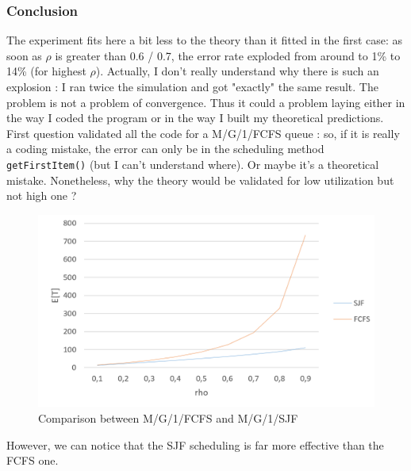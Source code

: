 \documentclass[a4paper]{report}
\begin{document}
\subsubsection{Conclusion}
The experiment fits here a bit less to the theory than it fitted in the first case: as soon as $\rho$ is greater than 0.6 / 0.7, the error rate exploded from around to 1\% to 14\% (for highest $\rho$). Actually, I don't really understand why there is such an explosion : I ran twice the simulation and got "exactly" the same result. The problem is not a problem of convergence. Thus it could a problem laying either in the way I coded the program or in the way I built my theoretical predictions. First question validated all the code for a M/G/1/FCFS queue : so, if it is really a coding mistake, the error can only be in the scheduling method \texttt{getFirstItem()} (but I can't understand where). Or maybe it's a theoretical mistake. Nonetheless, why the theory would be validated for low utilization but not high one ?

\begin{figure}[ht]
\begin{center}
\includegraphics[scale=.5]{Comp.PNG}
\end{center}
\caption{Comparison between M/G/1/FCFS and M/G/1/SJF}
\end{figure}

\medbreak
However, we can notice that the SJF scheduling is far more effective than the FCFS one.
\end{document}
